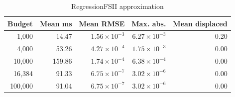 \begin{table}[htbp]
\centering
\caption{RegressionFSII approximation}
\begin{tabular}{rrrrr}
\toprule
Budget & Mean ms & Mean RMSE & Max. abs. & Mean displaced \\
\midrule
1,000 & 14.47 & \(1.56\times10^{-3}\) & \(6.27\times10^{-3}\) & 0.20 \\
4,000 & 53.26 & \(4.27\times10^{-4}\) & \(1.75\times10^{-3}\) & 0.00 \\
10,000 & 159.86 & \(1.74\times10^{-4}\) & \(6.38\times10^{-4}\) & 0.00 \\
16,384 & 91.33 & \(6.75\times10^{-7}\) & \(3.02\times10^{-6}\) & 0.00 \\
100,000 & 91.04 & \(6.75\times10^{-7}\) & \(3.02\times10^{-6}\) & 0.00 \\
\bottomrule
\end{tabular}
\end{table}
